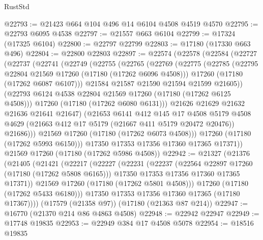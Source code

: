 \begin{lexlean}{RustStd}
\begin{coremodule}
{\begin{coremodule}
{{{{{{{{{{{{{{{{{{{{{{{{{{{{{{{{{{{{{{{{{{{{{{{{{{{{{{{@22793 := @21423 @664 @104 @496 @14 @6104 @4508 @4519 @4570
@22795 := @22793 @6095 @4538
@22797 := @21557 @663 @6104
@22799 := @17324 (@17325 @6104)
@22800 := @22797 @22799
@22803 := @17180 (@17330 @663 @496)
@22804 := @22800 @22803
@22897 := @22574
    (@22578
      (@22584
        (@22727
          (@22737
            (@22741
              (@22749
                (@22755
                  (@22765
                    (@22769
                      (@22775
                        (@22785
                          (@22795 @22804 @21569 @17260 (@17180 (@17262 @6096 @4508)))
                          @17260
                          (@17180 (@17262 @6087 @6107)))
                        @21584
                        @21587
                        @21590
                        @21594
                        @21599
                        @21605))
                    (@22793 @6124 @4538 @22804 @21569 @17260 (@17180 (@17262 @6125 @4508)))
                    @17260
                    (@17180 (@17262 @6080 @6131)))
                  @21626
                  @21629
                  @21632
                  @21636
                  @21641
                  @21647)
                (@21653
                  @6141
                  @412
                  @145
                  @17
                  @4508
                  @5179
                  @4508
                  @4629
                  (@21663 @412 @17 @5179 (@21667 @411 @5179 @20472 @20476))
                  @21686)))
            @21569
            @17260
            (@17180 (@17262 @6073 @4508)))
          @17260
          (@17180 (@17262 @5993 @6150)))
        @17350
        @17353
        @17356
        @17360
        @17365
        @17371))
    @21569
    @17260
    (@17180 (@17262 @5986 @4508))
@22942 := @21327
    (@21376
      (@21405
        (@21421
          (@22217
            (@22227
              (@22231
                (@22237
                  (@22564 @22897 @17260 (@17180 (@17262 @5808 @6165)))
                  @17350
                  @17353
                  @17356
                  @17360
                  @17365
                  @17371))
              @21569
              @17260
              (@17180 (@17262 @5801 @4508)))
            @17260
            (@17180 (@17262 @5433 @6180)))
          @17350
          @17353
          @17356
          @17360
          @17365
          (@17180 @17367))))
    (@17579 (@21358 @97))
    (@17180 (@21363 @87 @214))
@22947 := @16770 (@21370 @214 @86 @4863 @4508)
@22948 := @22942 @22947
@22949 := @17748 @19835
@22953 := @22949 @384 @17 @4508 @5078
@22954 := @18516 @19835
}}}}}}}}}}}}}}}}}}}}}}}}}}}}}}}}}}}}}}}}}}}}}}}}}}}}}}}
\end{coremodule}}
\end{coremodule}
\end{lexlean}
